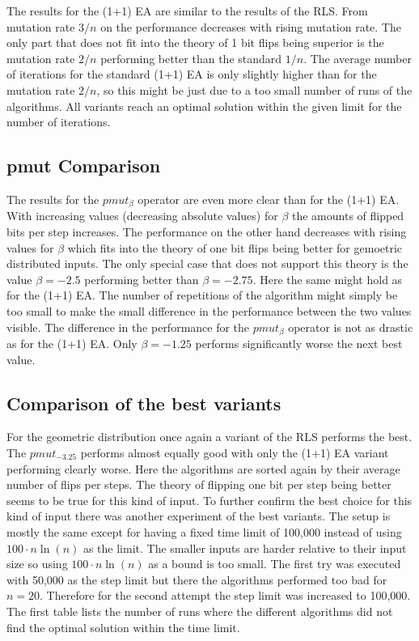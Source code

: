 The results for the (1+1) EA are similar to the results of the RLS. From mutation rate $3/n$ on the performance decreases with rising mutation rate.
The only part that does not fit into the theory of 1 bit flips being superior is the mutation rate $2/n$ performing better than the standard $1/n$.
The average number of iterations for the standard (1+1) EA is only slightly higher than for the mutation rate $2/n$, so this might be just due to a too small number of runs of the algorithms.
All variants reach an optimal solution within the given limit for the number of iterations.
\subsection{pmut Comparison}




The results for the $pmut_\beta$ operator are even more clear than for the (1+1) EA.
With increasing values (decreasing absolute values) for $\beta$ the amounts of flipped bits per step increases.
The performance on the other hand decreases with rising values for $\beta$ which fits into the theory of one bit flips being better for gemoetric distributed inputs.
The only special case that does not support this theory is the value $\beta=-2.5$ performing better than $\beta=-2.75$.
Here the same might hold as for the (1+1) EA.
The number of repetitions of the algorithm might simply be too small to make the small difference in the performance between the two values visible.
The difference in the performance for the $pmut_\beta$ operator is not as drastic as for the (1+1) EA.
Only $\beta=-1.25$ performs significantly worse the next best value.

\subsection{Comparison of the best variants}




For the geometric distribution once again a variant of the RLS performs the best.
The $pmut_{-3.25}$ performs almost equally good with only the (1+1) EA variant performing clearly worse.
Here the algorithms are sorted again by their average number of flips per steps.
The theory of flipping one bit per step being better seems to be true for this kind of input.\newline
To further confirm the best choice for this kind of input there was another experiment of the best variants.
The setup is mostly the same except for having a fixed time limit of 100,000 instead of using $100 \cdot n\ln(n)$ as the limit.
The smaller inputs are harder relative to their input size so using $100 \cdot n\ln(n)$ as a bound is too small.
The first try was executed with 50,000 as the step limit but there the algorithms performed too bad for $n=20$.
Therefore for the second attempt the step limit was increased to 100,000.
The first table lists the number of runs where the different algorithms did not find the optimal solution within the time limit.

